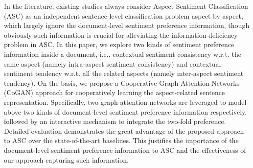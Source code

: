 In the literature, existing studies always consider Aspect Sentiment Classification (ASC) as an independent sentence-level classification problem aspect by aspect, which largely ignore the document-level sentiment preference information, though obviously such information is crucial for alleviating the information deficiency problem in ASC. In this paper, we explore two kinds of sentiment preference information inside a document, i.e., contextual sentiment consistency w.r.t. the same aspect (namely intra-aspect sentiment consistency) and contextual sentiment tendency w.r.t. all the related aspects (namely inter-aspect sentiment tendency). On the basis, we propose a Cooperative Graph Attention Networks (CoGAN) approach for cooperatively learning the aspect-related sentence representation. Specifically, two graph attention networks are leveraged to model above two kinds of document-level sentiment preference information respectively, followed by an interactive mechanism to integrate the two-fold preference. Detailed evaluation demonstrates the great advantage of the proposed approach to ASC over the state-of-the-art baselines. This justifies the importance of the document-level sentiment preference information to ASC and the effectiveness of our approach capturing such information.
